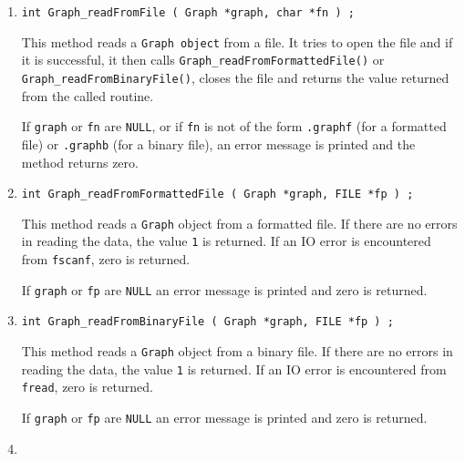 \begin{enumerate}
\item
\begin{verbatim}
int Graph_readFromFile ( Graph *graph, char *fn ) ;
\end{verbatim}
\par
This method reads a {\tt Graph object} from a file.
It tries to open the file and if it is successful, 
it then calls {\tt Graph\_readFromFormattedFile()} or
{\tt Graph\_readFromBinaryFile()}, 
closes the file
and returns the value returned from the called routine.
\par {}
If {\tt graph} or {\tt fn} are {\tt NULL}, 
or if {\tt fn} is not of the form
{\tt *.graphf} (for a formatted file) 
or {\tt *.graphb} (for a binary file),
an error message is printed and the method returns zero.
\item
\begin{verbatim}
int Graph_readFromFormattedFile ( Graph *graph, FILE *fp ) ;
\end{verbatim}
\par
This method reads a {\tt Graph} object from a formatted file.
If there are no errors in reading the data, 
the value {\tt 1} is returned.
If an IO error is encountered from {\tt fscanf}, zero is returned.
\par {}
If {\tt graph} or {\tt fp} are {\tt NULL} 
an error message is printed and zero is returned.
\item
\begin{verbatim}
int Graph_readFromBinaryFile ( Graph *graph, FILE *fp ) ;
\end{verbatim}
This method reads a {\tt Graph} object from a binary file.
If there are no errors in reading the data, 
the value {\tt 1} is returned.
If an IO error is encountered from {\tt fread}, zero is returned.
\par {}
If {\tt graph} or {\tt fp} are {\tt NULL} an error message 
is printed and zero is returned.
\item

\end{enumerate}
